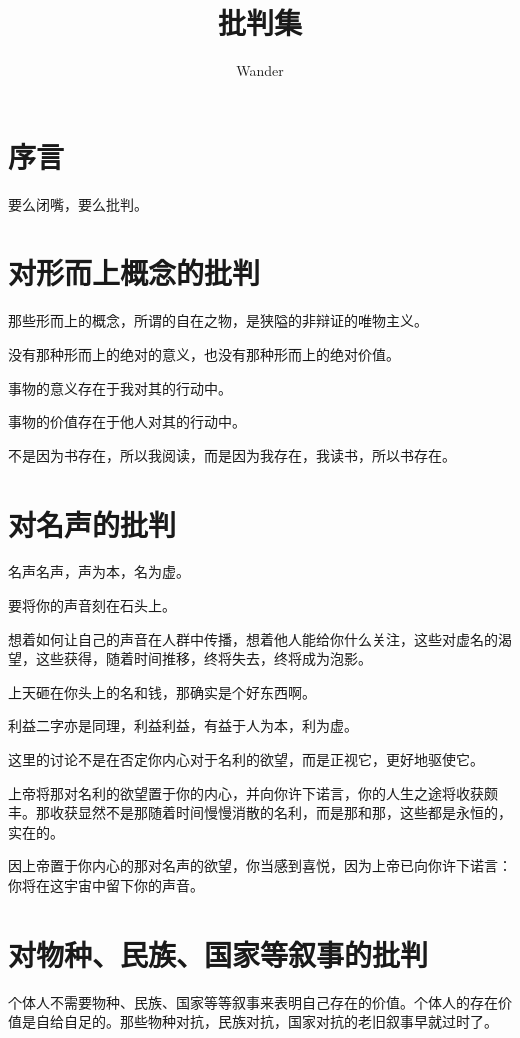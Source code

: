 \documentclass[12pt,oneside]{book}
\title{批判集}
\author{Wander}
\begin{document}
\makemytitleA
{}

\frontmatter 
{}
\chapter*{序言}
要么闭嘴，要么批判。

\setcounter{tocdepth}{2}    
\tableofcontents


\mainmatter


\chapter{对形而上概念的批判}
那些形而上的概念，所谓的自在之物，是狭隘的非辩证的唯物主义。

没有那种形而上的绝对的意义，也没有那种形而上的绝对价值。

事物的意义存在于我对其的行动中。

事物的价值存在于他人对其的行动中。

不是因为书存在，所以我阅读，而是因为我存在，我读书，所以书存在。




\chapter{对名声的批判}
名声名声，声为本，名为虚。

要将你的声音刻在石头上。


想着如何让自己的声音在人群中传播，想着他人能给你什么关注，这些对虚名的渴望，这些获得，随着时间推移，终将失去，终将成为泡影。

上天砸在你头上的名和钱，那确实是个好东西啊。

利益二字亦是同理，利益利益，有益于人为本，利为虚。

这里的讨论不是在否定你内心对于名利的欲望，而是正视它，更好地驱使它。

上帝将那对名利的欲望置于你的内心，并向你许下诺言，你的人生之途将收获颇丰。那收获显然不是那随着时间慢慢消散的名利，而是那和那，这些都是永恒的，实在的。

因上帝置于你内心的那对名声的欲望，你当感到喜悦，因为上帝已向你许下诺言：你将在这宇宙中留下你的声音。

\chapter{对物种、民族、国家等叙事的批判}
个体人不需要物种、民族、国家等等叙事来表明自己存在的价值。个体人的存在价值是自给自足的。那些物种对抗，民族对抗，国家对抗的老旧叙事早就过时了。
\end{document}
